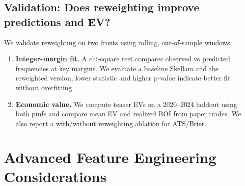 \subsection{Validation: Does reweighting improve predictions and EV?}\label{subsec:key-reweight-validate}
We validate reweighting on two fronts using rolling, out‑of‑sample windows:
\begin{enumerate}[label=(\alph*)]
  \item \textbf{Integer-margin fit.} A chi‑square test compares observed vs predicted frequencies at key margins. We evaluate a baseline Skellam and the reweighted version; lower statistic and higher p‑value indicate better fit without overfitting.
  \item \textbf{Economic value.} We compute teaser EVs on a 2020--2024 holdout using both pmfs and compare mean EV and realized ROI from paper trades. We also report a with/without reweighting ablation for ATS/Brier.
\end{enumerate}


\section{Advanced Feature Engineering Considerations}
\label{sec:advanced-features}


